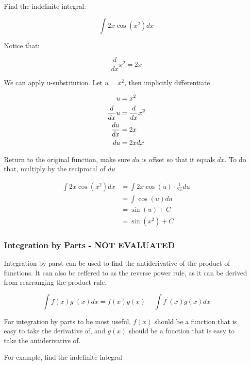 \documentclass[12pt]{article}
\begin{document}
        \noindent Find the indefinite integral:

        \[
            \int 2x\cos(x^2) dx    
        \]

        \noindent Notice that:

        \[
            \frac{d}{dx} x^2 = 2x
        \]

        \noindent We can apply u-substitution. Let $u = x^2$, then implicitly differentiate

        \[
            \begin{aligned}
                u &= x^2\\
                \frac{d}{dx}u &= \frac{d}{dx}x^2\\
                \frac{du}{dx} &= 2x \\
                du &= 2x\space dx
            \end{aligned}
        \]

        \noindent Return to the original function, make sure $du$ is offset so that it 
                 equals $dx$. To do that, multiply by the reciprocal of $du$

        \[
            \begin{aligned}
                \int 2x\cos(x^2)dx &= \int 2x\cos(u)\cdot\frac{1}{2x} du\\
                &= \int \cos(u) du\\
                &= \sin(u) + C\\
                &= \sin(x^2) + C
            \end{aligned}
        \]

        \subsubsection{Integration by Parts - NOT EVALUATED}
        
        Integration by parst can be used to find the antiderivative of the product of
        functions. It can also be reffered to as the reverse power rule, as it can be derived from 
        rearranging the product rule.

        \[
            \int f(x)g^{\prime}(x)dx = f(x)g(x) - \int f^{\prime}(x)g(x)dx    
        \]

        For integration by parts to be most useful, $f(x)$ should be a function that is easy to take
        the derivative of, and $g(x)$ should be a function that is easy to take the antiderivative of.

        \noindent For example, find the indefinite integral
\end{document}
